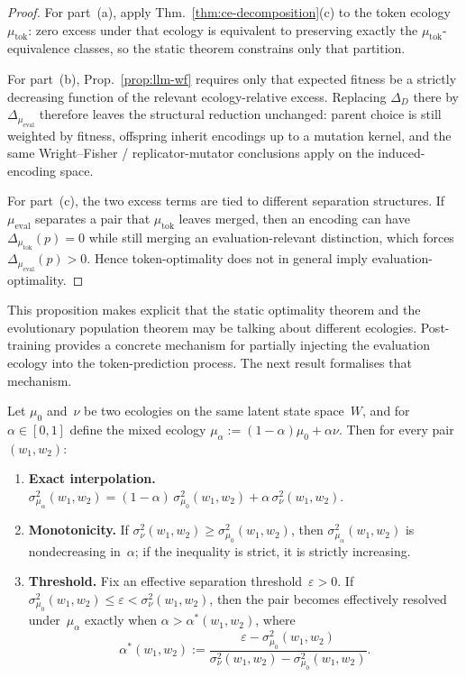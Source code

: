 \documentclass[twoside,11pt]{article}
\newcommand{\sigmasq}{\sigma^2}
\newcommand{\thmref}[1]{Thm.~\ref{#1}}
\newcommand{\propref}[1]{Prop.~\ref{#1}}
\begin{document}
\begin{proof}
For part~(a), apply \thmref{thm:ce-decomposition}(c) to the token ecology~$\mu_{\mathrm{tok}}$: zero excess under that ecology is equivalent to preserving exactly the $\mu_{\mathrm{tok}}$-equivalence classes, so the static theorem constrains only that partition.

For part~(b), \propref{prop:llm-wf} requires only that expected fitness be a strictly decreasing function of the relevant ecology-relative excess. Replacing $\Delta_D$ there by $\Delta_{\mu_{\mathrm{eval}}}$ therefore leaves the structural reduction unchanged: parent choice is still weighted by fitness, offspring inherit encodings up to a mutation kernel, and the same Wright--Fisher / replicator-mutator conclusions apply on the induced-encoding space.

For part~(c), the two excess terms are tied to different separation structures. If $\mu_{\mathrm{eval}}$ separates a pair that $\mu_{\mathrm{tok}}$ leaves merged, then an encoding can have $\Delta_{\mu_{\mathrm{tok}}}(p)=0$ while still merging an evaluation-relevant distinction, which forces $\Delta_{\mu_{\mathrm{eval}}}(p)>0$. Hence token-optimality does not in general imply evaluation-optimality.
\end{proof}

This proposition makes explicit that the static optimality theorem and the evolutionary population theorem may be talking about different ecologies. Post-training provides a concrete mechanism for partially injecting the evaluation ecology into the token-prediction process. The next result formalises that mechanism.

\begin{proposition}\label{prop:ecology-injection}
Let $\mu_0$ and~$\nu$ be two ecologies on the same latent state space~$W$, and for $\alpha\in[0,1]$ define the mixed ecology $\mu_\alpha := (1-\alpha)\mu_0 + \alpha\nu$. Then for every pair $(w_1,w_2)$:
\begin{enumerate}[label=(\alph*)]
\item \textbf{Exact interpolation.}
$\sigmasq_{\mu_\alpha}(w_1,w_2) = (1-\alpha)\,\sigmasq_{\mu_0}(w_1,w_2) + \alpha\,\sigmasq_\nu(w_1,w_2)$.

\item \textbf{Monotonicity.} If $\sigmasq_\nu(w_1,w_2) \ge \sigmasq_{\mu_0}(w_1,w_2)$, then $\sigmasq_{\mu_\alpha}(w_1,w_2)$ is nondecreasing in~$\alpha$; if the inequality is strict, it is strictly increasing.

\item \textbf{Threshold.} Fix an effective separation threshold~$\varepsilon>0$. If $\sigmasq_{\mu_0}(w_1,w_2)\le\varepsilon < \sigmasq_\nu(w_1,w_2)$, then the pair becomes effectively resolved under~$\mu_\alpha$ exactly when $\alpha > \alpha^*(w_1,w_2)$, where
\[
\alpha^*(w_1,w_2) := \frac{\varepsilon - \sigmasq_{\mu_0}(w_1,w_2)}{\sigmasq_\nu(w_1,w_2) - \sigmasq_{\mu_0}(w_1,w_2)}.
\]
\end{enumerate}
\end{proposition}
\end{document}
